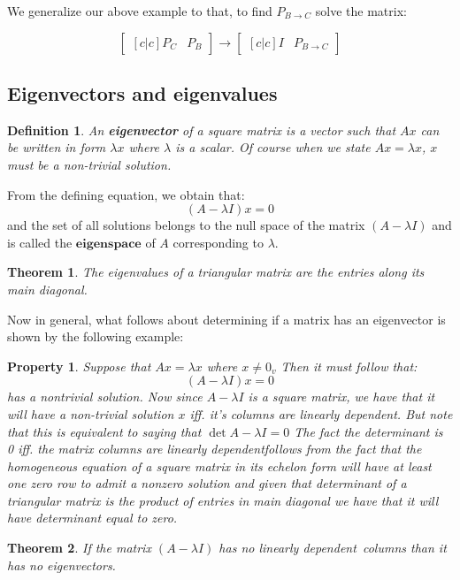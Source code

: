 \documentclass[titlepage]{article}
\newtheorem{thm}{Theorem}[subsection]
\newtheorem{property}{Property}
\newtheorem{definition}{Definition}[subsection]
\numberwithin{equation}{subsection}
\newcommand{\ld}{linearly dependent}
\begin{document}
We generalize our above example to that, to find $P_{B\to C}$ solve the matrix:

$$\begin{bmatrix}[c|c]
    P_{C} & P_{B}
\end{bmatrix} \rightarrow \begin{bmatrix}[c|c]
    I & P_{B\to C}
\end{bmatrix}$$

\subsection{Eigenvectors and eigenvalues}

\begin{definition}
An \textbf{eigenvector} of a square matrix is a vector such that $Ax$ can be written in form $\lambda x$ where $\lambda$ is a scalar. Of course when we state $Ax=\lambda x$, $x$ must be a non-trivial solution. 
\end{definition}

From the defining equation, we obtain that:
$$ (A - \lambda I)x = 0$$ and the set of all solutions belongs to the null space of the matrix $(A - \lambda I)$ and is called the $\textbf{eigenspace}$ of $A$ corresponding to $\lambda$. 

\begin{thm}
\label{eig}
The eigenvalues of a triangular matrix are the entries along its main diagonal.
\end{thm}

Now in general, what follows about determining if a matrix has an eigenvector is shown by the  following example:

\begin{property}
Suppose that $Ax = \lambda x$ where $x\not = 0_{v}$ Then it must follow that:
$$(A-\lambda I)x=0$$ has a nontrivial solution. Now since $A-\lambda I$ is a square matrix, we have that it will have a non-trivial solution $x$ iff. it's columns are linearly dependent. But note that this is equivalent to saying that $\det{A-\lambda I} = 0$ The fact the determinant is 0 iff. the matrix columns are \ld follows from the fact that the homogeneous equation of a square matrix in its echelon form will have at least one zero row to admit a nonzero solution and given that determinant of a triangular matrix is the product of entries in main diagonal we have that it will have determinant equal to zero. 
\end{property} 

\begin{thm}
If the matrix $(A-\lambda I)$ has no \ld \ columns than it has no eigenvectors. 
\end{thm}
\end{document}
